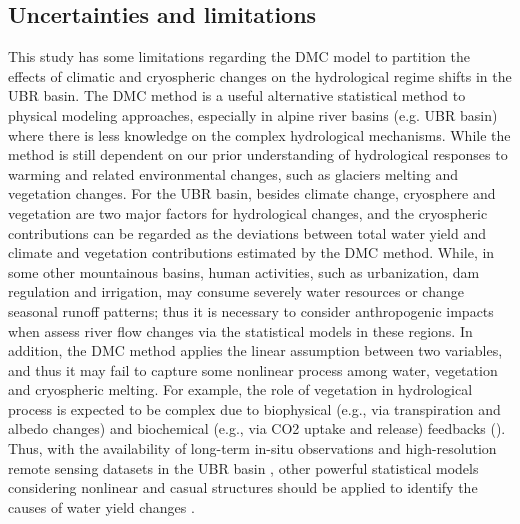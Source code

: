 \documentclass[hess, manuscript]{copernicus}
\begin{document}
\subsection{Uncertainties and limitations}
This study has some limitations regarding the DMC model to partition the effects of climatic and cryospheric changes on the hydrological regime shifts in the UBR basin. The DMC method is a useful alternative statistical method to physical modeling approaches, especially in alpine river basins (e.g. UBR basin) where there is less knowledge on the complex hydrological mechanisms. While the method is still dependent on our prior understanding of hydrological responses to warming and related environmental changes, such as glaciers melting and vegetation changes. For the UBR basin, besides climate change, cryosphere \citep{biemans2019importance,yao2019recent} and vegetation \citep{li2021vegetation,li2019greening} are two major factors for hydrological changes, and the cryospheric contributions can be regarded as the deviations between total water yield and climate and vegetation contributions estimated by the DMC method. While, in some other mountainous basins, human activities, such as urbanization, dam regulation and irrigation, may consume severely water resources or change seasonal runoff patterns; thus it is necessary to consider anthropogenic impacts when assess river flow changes via the statistical models in these regions. In addition, the DMC method applies the linear assumption between two variables, and thus it may fail to capture some nonlinear process among water, vegetation and cryospheric melting. For example, the role of vegetation in hydrological process is expected to be complex due to biophysical (e.g., via transpiration and albedo changes) and biochemical (e.g., via CO2 uptake and release) feedbacks (\citealt{bonan2008forests,krich2022decoupling}). Thus, with the availability of long-term in-situ observations and high-resolution remote sensing datasets in the UBR basin \citep{wang2022observing}, other powerful statistical models considering nonlinear and casual structures should be applied to identify the causes of water yield changes \citep{runge2019inferring}.
\end{document}
